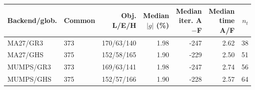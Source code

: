 \begin{tabular}{@{}llrrrrr@{}}
\toprule
Backend/glob. & Common & Obj. L/E/H & \shortstack{Median\\$|g|$ (\%)} & \shortstack{Median\\iter. A$-$F} & \shortstack{Median\\time A/F} & $n_t$\\
\midrule
MA27/GR3 & 373 & 170/63/140 & 1.98 & -247 & 2.62 & 38\\
MA27/GHS & 375 & 152/58/165 & 1.90 & -229 & 2.50 & 51\\
MUMPS/GR3 & 373 & 169/63/141 & 1.98 & -247 & 2.74 & 56\\
MUMPS/GHS & 375 & 152/57/166 & 1.90 & -228 & 2.57 & 64\\
\bottomrule
\end{tabular}
